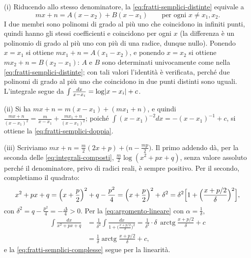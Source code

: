 \begin{dimostrazione}
(i) Riducendo allo stesso denominatore, la \eqref{eq:fratti-semplici-distinte} equivale a
\[
  mx+n=A(x-x_{2})+B(x-x_{1}) \qquad\text{per ogni } x\neq x_{1},x_{2} .
\]
I due membri sono polinomi di grado al più uno che coincidono in infiniti punti, quindi
hanno gli stessi coefficienti e coincidono per ogni $x$ (la differenza è un polinomio
di grado al più uno con più di una radice, dunque nullo). Ponendo $x=x_{1}$ si ottiene
$mx_{1}+n=A(x_{1}-x_{2})$, e ponendo $x=x_{2}$ si ottiene $mx_{2}+n=B(x_{2}-x_{1})$: $A$ e $B$ sono
determinati univocamente come nella \eqref{eq:fratti-semplici-distinte}; con tali valori
l'identità è verificata, perché due polinomi di grado al più uno che coincidono in due
punti distinti sono uguali. L'integrale segue da $\int\frac{dx}{x-x_{i}}=\log\lvert x-x_{i}\rvert+c$.

(ii) Si ha $mx+n=m(x-x_{1})+(mx_{1}+n)$, e quindi
$\frac{mx+n}{(x-x_{1})^{2}}=\frac m{x-x_{1}}+\frac{mx_{1}+n}{(x-x_{1})^{2}}$; poiché
$\int(x-x_{1})^{-2}dx=-(x-x_{1})^{-1}+c$, si ottiene la \eqref{eq:fratti-semplici-doppia}.

(iii) Scriviamo $mx+n=\frac m2(2x+p)+\bigl(n-\frac{mp}2\bigr)$. Il primo addendo dà, per la
seconda delle \eqref{eq:integrali-composti}, $\frac m2\log(x^{2}+px+q)$, senza valore
assoluto perché il denominatore, privo di radici reali, è sempre positivo. Per il
secondo, completiamo il quadrato:
\[
  x^{2}+px+q=\Bigl(x+\frac p2\Bigr)^{2}+q-\frac{p^{2}}4=\Bigl(x+\frac p2\Bigr)^{2}+\delta^{2}
  =\delta^{2}\Bigl[1+\Bigl(\frac{x+p/2}\delta\Bigr)^{2}\Bigr] ,
\]
con $\delta^{2}=q-\frac{p^{2}}4=-\frac\Delta4>0$. Per la \eqref{eq:argomento-lineare} con
$\alpha=\frac1\delta$,
\[
\begin{aligned}
  \int\frac{dx}{x^{2}+px+q}&=\frac1{\delta^{2}}\int\frac{dx}{1+\bigl(\frac{x+p/2}\delta\bigr)^{2}}
  =\frac1{\delta^{2}}\cdot\delta\,\operatorname{arctg}\frac{x+p/2}\delta+c\\
  &=\frac1\delta\operatorname{arctg}\frac{x+p/2}\delta+c ,
\end{aligned}
\]
e la \eqref{eq:fratti-semplici-complesse} segue per la linearità.
\end{dimostrazione}

